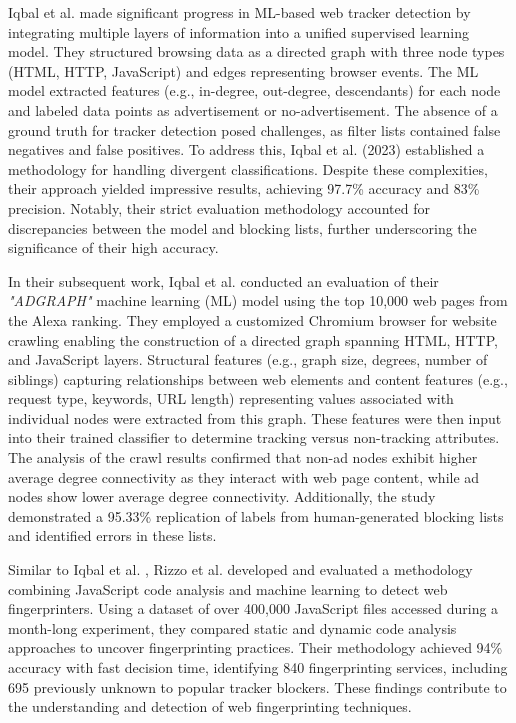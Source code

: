 Iqbal et al. \cite{iqbal2018adgraph} made significant progress in ML-based web tracker detection by integrating multiple layers of information
into a unified supervised learning model. They structured browsing data as a directed graph with three node types
(HTML, HTTP, JavaScript) and edges representing browser events. The ML model extracted features (e.g., in-degree, out-degree, descendants)
for each node and labeled data points as advertisement or no-advertisement. The absence of a ground truth for tracker detection
posed challenges, as filter lists contained false negatives and false positives. To address this, Iqbal et al. (2023) established 
a methodology for handling divergent classifications. Despite these complexities, their approach yielded impressive results,
achieving 97.7\% accuracy and 83\% precision. Notably, their strict evaluation methodology accounted for discrepancies between
the model and blocking lists, further underscoring the significance of their high accuracy.

In their subsequent work, Iqbal et al. \cite{iqbal2020adgraph} conducted an evaluation of their \emph{"ADGRAPH"} \cite{adgraph} machine learning (ML) model
using the top 10,000 web pages from the Alexa ranking. They employed a customized Chromium browser for website
crawling enabling the construction of a directed graph spanning HTML, HTTP, and
JavaScript layers. Structural features (e.g., graph size, degrees, number of siblings) capturing relationships between web
elements and content features (e.g., request type, keywords, URL length) representing values associated with individual
nodes were extracted from this graph. These features were then input into their trained classifier to determine tracking
versus non-tracking attributes. The analysis of the crawl results confirmed that non-ad nodes exhibit higher average
degree connectivity as they interact with web page content, while ad nodes show lower average degree connectivity.
Additionally, the study demonstrated a 95.33\% replication of labels from human-generated blocking lists and identified errors
in these lists.

Similar to Iqbal et al. \cite{iqbal2020adgraph}, Rizzo et al. \cite{rizzo2021unveiling} developed and
evaluated a methodology combining JavaScript code analysis and machine learning to detect web fingerprinters.
Using a dataset of over 400,000 JavaScript files accessed during a month-long experiment, they compared static
and dynamic code analysis approaches to uncover fingerprinting practices. Their methodology achieved 94\% accuracy
with fast decision time, identifying 840 fingerprinting services, including 695 previously unknown to popular tracker
blockers. These findings contribute to the understanding and detection of web fingerprinting techniques.


